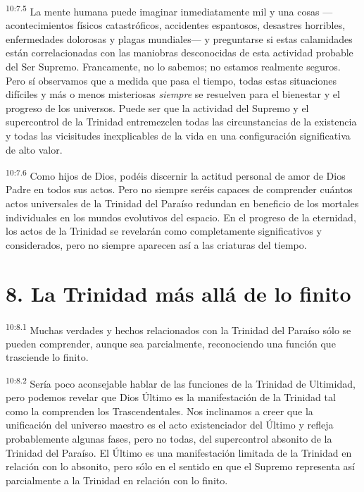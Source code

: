 \par
\textsuperscript{10:7.5} La mente humana puede imaginar inmediatamente mil y una cosas ---acontecimientos físicos catastróficos, accidentes espantosos, desastres horribles, enfermedades dolorosas y plagas mundiales--- y preguntarse si estas calamidades están correlacionadas con las maniobras desconocidas de esta actividad probable del Ser Supremo. Francamente, no lo sabemos; no estamos realmente seguros. Pero sí observamos que a medida que pasa el tiempo, todas estas situaciones difíciles y más o menos misteriosas \textit{siempre} se resuelven para el bienestar y el progreso de los universos. Puede ser que la actividad del Supremo y el supercontrol de la Trinidad entremezclen todas las circunstancias de la existencia y todas las vicisitudes inexplicables de la vida en una configuración significativa de alto valor.

\par
\textsuperscript{10:7.6} Como hijos de Dios, podéis discernir la actitud personal de amor de Dios Padre en todos sus actos. Pero no siempre seréis capaces de comprender cuántos actos universales de la Trinidad del Paraíso redundan en beneficio de los mortales individuales en los mundos evolutivos del espacio. En el progreso de la eternidad, los actos de la Trinidad se revelarán como completamente significativos y considerados, pero no siempre aparecen así a las criaturas del tiempo.

\section*{8. La Trinidad más allá de lo finito}
\par
\textsuperscript{10:8.1} Muchas verdades y hechos relacionados con la Trinidad del Paraíso sólo se pueden comprender, aunque sea parcialmente, reconociendo una función que trasciende lo finito.

\par
\textsuperscript{10:8.2} Sería poco aconsejable hablar de las funciones de la Trinidad de Ultimidad, pero podemos revelar que Dios Último es la manifestación de la Trinidad tal como la comprenden los Trascendentales. Nos inclinamos a creer que la unificación del universo maestro es el acto existenciador del Último y refleja probablemente algunas fases, pero no todas, del supercontrol absonito de la Trinidad del Paraíso. El Último es una manifestación limitada de la Trinidad en relación con lo absonito, pero sólo en el sentido en que el Supremo representa así parcialmente a la Trinidad en relación con lo finito.

